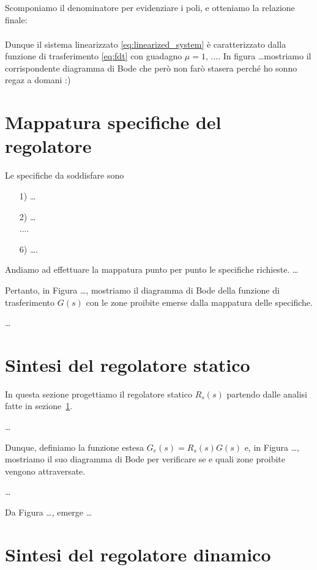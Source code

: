 \documentclass[a4paper, 11pt]{article}
\begin{document}
Scomponiamo il denominatore per evidenziare i poli, e otteniamo la relazione finale:
\begin{align}\label{eq:fdt}
\end{align}

Dunque il sistema linearizzato \eqref{eq:linearized_system} è caratterizzato dalla funzione di trasferimento \eqref{eq:fdt} con guadagno $\mu=1$, .... In figura \dots mostriamo il corrispondente diagramma di Bode che però non farò stasera perché ho sonno regaz a domani :)


\section{Mappatura specifiche del regolatore}
\label{sec:specifications}

Le specifiche da soddisfare sono
\begin{itemize}
	\item[1)] \dots\\
	\item[2)] \dots\\
	....\\
	\item[6)] \dots.
\end{itemize}
%
Andiamo ad effettuare la mappatura punto per punto le specifiche richieste. \dots  

Pertanto, in Figura \dots, mostriamo il diagramma di Bode della funzione di trasferimento $G(s)$ con le zone proibite emerse dalla mappatura delle specifiche.

\dots

\section{Sintesi del regolatore statico}
\label{sec:static_regulator}

In questa sezione progettiamo il regolatore statico $R_s(s)$ partendo dalle analisi fatte in sezione~\ref{sec:specifications}.

\dots

Dunque, definiamo la funzione estesa $G_e(s) = R_s(s)G(s)$ e, in Figura \dots, mostriamo il suo diagramma di Bode per verificare se e quali zone proibite vengono attraversate.

\dots

Da Figura \dots, emerge \dots


\section{Sintesi del regolatore dinamico}
\end{document}
